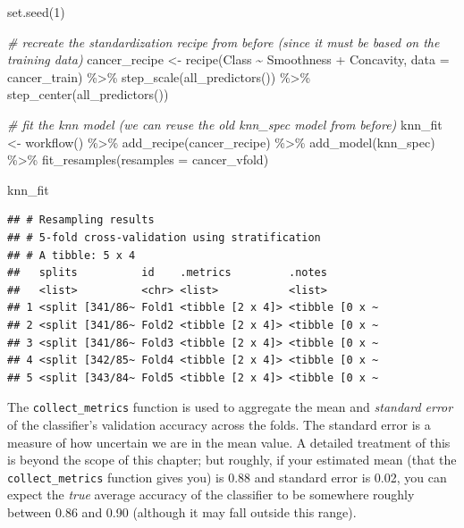 \documentclass[
]{krantz}
\makeatletter
\newenvironment{Shaded}{\begin{snugshade}}{\end{snugshade}}
\newcommand{\AttributeTok}[1]{\textcolor[rgb]{0.61,0.61,0.61}{#1}}
\newcommand{\CommentTok}[1]{\textcolor[rgb]{0.37,0.37,0.37}{\textit{#1}}}
\newcommand{\DecValTok}[1]{\textcolor[rgb]{0.06,0.06,0.06}{#1}}
\newcommand{\FunctionTok}[1]{\textcolor[rgb]{0,0,0}{#1}}
\newcommand{\NormalTok}[1]{#1}
\newcommand{\OtherTok}[1]{\textcolor[rgb]{0.37,0.37,0.37}{#1}}
\newcommand{\SpecialCharTok}[1]{\textcolor[rgb]{0,0,0}{#1}}
\newenvironment{kframe}{%
\medskip{}
\setlength{\fboxsep}{.8em}
 \def\at@end@of@kframe{}%
 \ifinner\ifhmode%
  \def\at@end@of@kframe{\end{minipage}}%
  \begin{minipage}{\columnwidth}%
 \fi\fi%
 \def\FrameCommand##1{\hskip\@totalleftmargin \hskip-\fboxsep
 \colorbox{shadecolor}{##1}\hskip-\fboxsep
     \hskip-\linewidth \hskip-\@totalleftmargin \hskip\columnwidth}%
 \MakeFramed {\advance\hsize-\width
   \@totalleftmargin\z@ \linewidth\hsize
   \@setminipage}}%
 {\par\unskip\endMakeFramed%
 \at@end@of@kframe}
\renewenvironment{Shaded}{\begin{kframe}}{\end{kframe}}
\makeatother
\begin{document}
\begin{Shaded}
\begin{Highlighting}[]
\FunctionTok{set.seed}\NormalTok{(}\DecValTok{1}\NormalTok{)}

\CommentTok{\# recreate the standardization recipe from before (since it must be based on the training data)}
\NormalTok{cancer\_recipe }\OtherTok{\textless{}{-}} \FunctionTok{recipe}\NormalTok{(Class }\SpecialCharTok{\textasciitilde{}}\NormalTok{ Smoothness }\SpecialCharTok{+}\NormalTok{ Concavity, }\AttributeTok{data =}\NormalTok{ cancer\_train) }\SpecialCharTok{\%\textgreater{}\%}
  \FunctionTok{step\_scale}\NormalTok{(}\FunctionTok{all\_predictors}\NormalTok{()) }\SpecialCharTok{\%\textgreater{}\%}
  \FunctionTok{step\_center}\NormalTok{(}\FunctionTok{all\_predictors}\NormalTok{())}

\CommentTok{\# fit the knn model (we can reuse the old knn\_spec model from before)}
\NormalTok{knn\_fit }\OtherTok{\textless{}{-}} \FunctionTok{workflow}\NormalTok{() }\SpecialCharTok{\%\textgreater{}\%}
  \FunctionTok{add\_recipe}\NormalTok{(cancer\_recipe) }\SpecialCharTok{\%\textgreater{}\%}
  \FunctionTok{add\_model}\NormalTok{(knn\_spec) }\SpecialCharTok{\%\textgreater{}\%}
  \FunctionTok{fit\_resamples}\NormalTok{(}\AttributeTok{resamples =}\NormalTok{ cancer\_vfold)}

\NormalTok{knn\_fit}
\end{Highlighting}
\end{Shaded}

\begin{verbatim}
## # Resampling results
## # 5-fold cross-validation using stratification 
## # A tibble: 5 x 4
##   splits          id    .metrics         .notes        
##   <list>          <chr> <list>           <list>        
## 1 <split [341/86~ Fold1 <tibble [2 x 4]> <tibble [0 x ~
## 2 <split [341/86~ Fold2 <tibble [2 x 4]> <tibble [0 x ~
## 3 <split [341/86~ Fold3 <tibble [2 x 4]> <tibble [0 x ~
## 4 <split [342/85~ Fold4 <tibble [2 x 4]> <tibble [0 x ~
## 5 <split [343/84~ Fold5 <tibble [2 x 4]> <tibble [0 x ~
\end{verbatim}

The \texttt{collect\_metrics} function is used to aggregate the mean and \emph{standard error}
of the classifier's validation accuracy across the folds. The standard error is
a measure of how uncertain we are in the mean value. A detailed treatment of this
is beyond the scope of this chapter; but roughly, if your estimated mean (that
the \texttt{collect\_metrics} function gives you) is 0.88 and standard
error is 0.02, you can expect the \emph{true} average accuracy of the
classifier to be somewhere roughly between 0.86 and 0.90 (although it may
fall outside this range).
\end{document}
